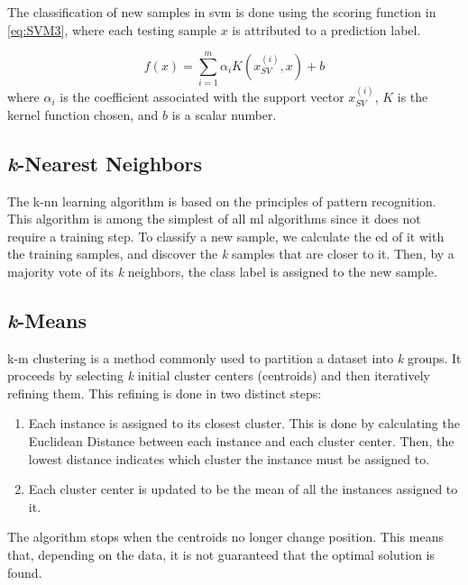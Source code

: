 The classification of new samples in \ac{svm} is done using the scoring function in \ref{eq:SVM3}, where each testing sample $x$ is attributed to a prediction label.

\begin{equation}
\label{eq:SVM3}
f(x)=\sum_{i=1}^m \alpha_i K (x_{SV}^{(i)},x)+b
\end{equation}
where $\alpha_i$ is the coefficient associated with the support vector $x_{SV}^{(i)}$, $K$ is the kernel function chosen, and $b$ is a scalar number.


\subsection{\textit{k}-Nearest Neighbors}
\label{ssec:kNearestNeighbors}

The \ac{k-nn} learning algorithm is based on the principles of pattern recognition. This algorithm is among the simplest of all \ac{ml} algorithms since it does not require a training step. To classify a new sample, we calculate the \ac{ed} of it with the training samples, and discover the \textit{k} samples that are closer to it. Then, by a majority vote of its \textit{k} neighbors, the class label is assigned to the new sample.


\subsection{\textit{k}-Means}
\label{ssec:kMeans}

\ac{k-m} clustering is a method commonly used to partition a dataset into \textit{k} groups. It proceeds by selecting \textit{k} initial cluster centers (centroids) and then iteratively refining them. This refining is done in two distinct steps:

\begin{enumerate}
    \item Each instance is assigned to its closest cluster. This is done by calculating the Euclidean Distance between each instance and each cluster center. Then, the lowest distance indicates which cluster the instance must be assigned to.
    \item Each cluster center is updated to be the mean of all the instances assigned to it.
\end{enumerate}
The algorithm stops when the centroids no longer change position. This means that, depending on the data, it is not guaranteed that the optimal solution is found.

